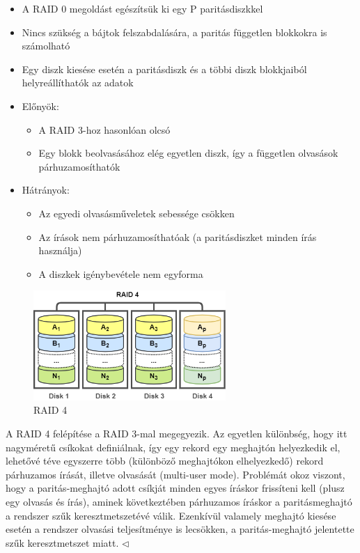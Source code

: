 \documentclass[tikz,12pt,margin=0px]{article}
\begin{document}
    \begin{itemize}[topsep=8pt,itemsep=4pt,partopsep=4pt, parsep=4pt]
        \item  A RAID 0 megoldást egészítsük ki egy P paritásdiszkkel
        \item Nincs szükség a bájtok felszabdalására, a paritás független blokkokra is számolható
        \item Egy diszk kiesése esetén a paritásdiszk és a többi diszk blokkjaiból helyreállíthatók az adatok
        \item Előnyök:
        \begin{itemize}
            \item A RAID 3-hoz hasonlóan olcsó
            \item Egy blokk beolvasásához elég egyetlen diszk, így a független olvasások párhuzamosíthatók
        \end{itemize}
        \item Hátrányok:
        \begin{itemize}
            \item Az egyedi olvasásműveletek sebessége csökken
            \item Az írások nem párhuzamosíthatóak (a paritásdiszket minden írás használja)
            \item A diszkek igénybevétele nem egyforma
        \end{itemize}
    \end{itemize}

    \begin{figure}[H]
        \centering
        \includegraphics[width=0.65\textwidth]{img/raid4.png}
        \caption{RAID 4}
        \label{ref:raid4}
    \end{figure}

    {\footnotesize \noindent {\color{blue} \faLightbulbO\ $\triangleright$ } }
    {\footnotesize
    \noindent A RAID 4 felépítése a RAID 3-mal megegyezik. Az egyetlen különbség, hogy itt nagyméretű csíkokat definiálnak, így egy rekord egy meghajtón helyezkedik el, lehetővé téve egyszerre több (különböző meghajtókon elhelyezkedő) rekord párhuzamos írását, illetve olvasását (multi-user mode). Problémát okoz viszont, hogy a paritás-meghajtó adott csíkját minden egyes íráskor frissíteni kell (plusz egy olvasás és írás), aminek következtében párhuzamos íráskor a paritásmeghajtó a rendszer szűk keresztmetszetévé válik. Ezenkívül valamely meghajtó kiesése esetén a rendszer olvasási teljesítménye is lecsökken, a paritás-meghajtó jelentette szűk keresztmetszet miatt.
    $\triangleleft$ \faLightbulbO}\\
\end{document}

